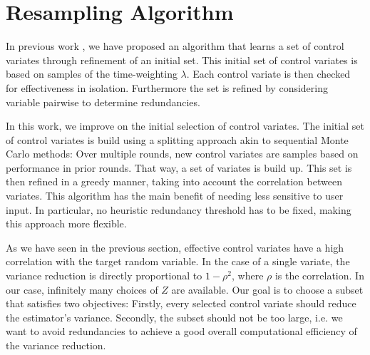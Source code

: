 \section{Resampling Algorithm}\label{sec:splitting}
In previous work \parencite{backenkohler2019control}, we have
proposed an algorithm that learns a set of
control variates through refinement of an initial set.
This initial set of control variates is based on samples of the
time-weighting $\lambda$.
Each control variate is then checked for effectiveness in isolation.
Furthermore the set is refined by considering variable pairwise to
determine redundancies.

In this work, we improve on the initial selection of control variates.
The initial set of control variates is build using a splitting
approach akin to sequential Monte Carlo methods:
Over multiple rounds, new control variates are samples based on
performance in prior rounds.
That way, a set of variates is build up.
This set is then refined in a greedy manner, taking into account the
correlation between variates.
This algorithm has the main benefit of needing less sensitive to user input.
In particular, no heuristic redundancy threshold has to be fixed,
making this approach more flexible.

As we have seen in the previous section, effective control variates
have a high correlation
with the target random variable.
In the case of a single variate, the variance reduction is directly
proportional to $1-\rho^2$, where
$\rho$ is the correlation.
In our case, infinitely many choices of $Z$ are available.
Our goal is to choose a subset that
satisfies two objectives:
Firstly, every selected control variate should reduce the estimator's variance.
Secondly, the subset should not be too large, i.e.  we want to avoid
redundancies to achieve
a good  overall computational efficiency of the variance reduction.

